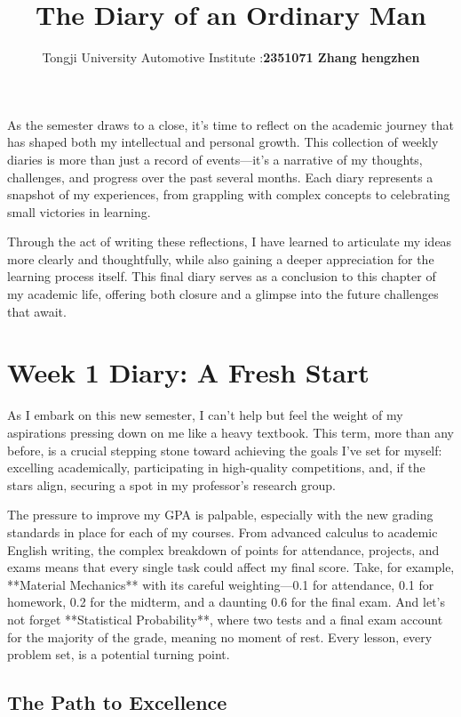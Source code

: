 \documentclass[a4paper]{article} 	%
\title{\textbf{The Diary of an Ordinary Man}}
\author{Tongji University Automotive Institute :\textbf{2351071 Zhang hengzhen}}
\date{}
\begin{document}
\maketitle

As the semester draws to a close, it's time to reflect on the academic journey that has shaped both my intellectual and personal growth. This collection of weekly diaries is more than just a record of events—it's a narrative of my thoughts, challenges, and progress over the past several months. Each diary represents a snapshot of my experiences, from grappling with complex concepts to celebrating small victories in learning.

Through the act of writing these reflections, I have learned to articulate my ideas more clearly and thoughtfully, while also gaining a deeper appreciation for the learning process itself. This final diary serves as a conclusion to this chapter of my academic life, offering both closure and a glimpse into the future challenges that await.
\section{Week 1 Diary: A Fresh Start}

As I embark on this new semester, I can’t help but feel the weight of my aspirations pressing down on me like a heavy textbook. This term, more than any before, is a crucial stepping stone toward achieving the goals I’ve set for myself: excelling academically, participating in high-quality competitions, and, if the stars align, securing a spot in my professor’s research group. 

The pressure to improve my GPA is palpable, especially with the new grading standards in place for each of my courses. From advanced calculus to academic English writing, the complex breakdown of points for attendance, projects, and exams means that every single task could affect my final score. Take, for example, **Material Mechanics** with its careful weighting—0.1 for attendance, 0.1 for homework, 0.2 for the midterm, and a daunting 0.6 for the final exam. And let’s not forget **Statistical Probability**, where two tests and a final exam account for the majority of the grade, meaning no moment of rest. Every lesson, every problem set, is a potential turning point.

\subsection*{The Path to Excellence}
\end{document}
